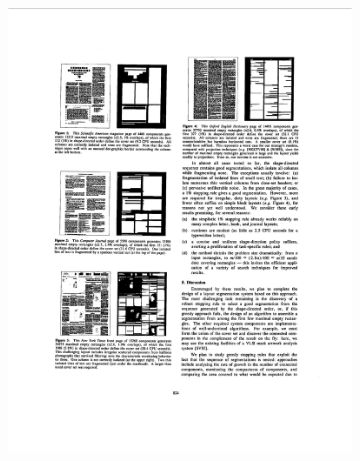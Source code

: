 \documentclass{report}
\begin{document}
\begin{figure}
\centering
\begin{subfigure}{0.47\textwidth}
\includegraphics[width = \textwidth]{document1.png}
\end{subfigure}
\hspace*{0.03\textwidth}
\begin{subfigure}{0.47\textwidth}

\end{subfigure}
\end{figure}
\end{document}
